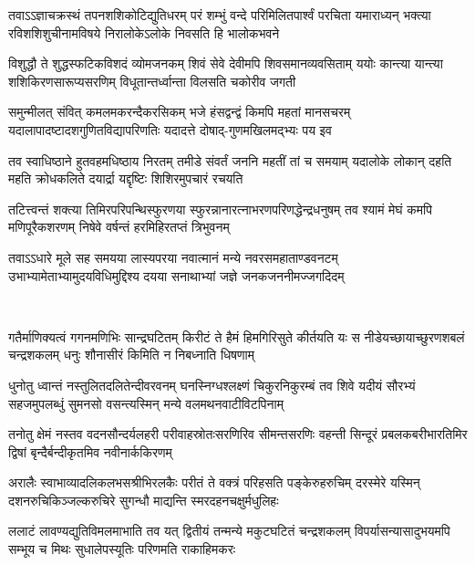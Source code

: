 \fourlineindentedshloka
{तवाऽऽज्ञाचक्रस्थं तपनशशिकोटिद्युतिधरम्}
{परं शम्भुं वन्दे परिमिलितपार्श्वं परचिता}
{यमाराध्यन् भक्त्या रविशशिशुचीनामविषये}
{निरालोकेऽलोके निवसति हि भालोकभवने}%

\fourlineindentedshloka
{विशुद्धौ ते शुद्धस्फटिकविशदं व्योमजनकम्}
{शिवं सेवे देवीमपि शिवसमानव्यवसिताम्}
{ययोः कान्त्या यान्त्या शशिकिरणसारूप्यसरणिम्}
{विधूतान्तर्ध्वान्ता विलसति चकोरीव जगती}%

\fourlineindentedshloka
{समुन्मीलत् संवित् कमलमकरन्दैकरसिकम्}
{भजे हंसद्वन्द्वं किमपि महतां मानसचरम्}
{यदालापादष्टादशगुणितविद्यापरिणतिः}
{यदादत्ते दोषाद्-गुणमखिलमद्भ्यः पय इव}%

\fourlineindentedshloka
{तव स्वाधिष्ठाने हुतवहमधिष्ठाय निरतम्}
{तमीडे संवर्तं जननि महतीं तां च समयाम्}
{यदालोके लोकान् दहति महति क्रोधकलिते}
{दयार्द्रा यद्दृष्टिः शिशिरमुपचारं रचयति}%

\fourlineindentedshloka
{तटित्त्वन्तं शक्त्या तिमिरपरिपन्थिस्फुरणया}
{स्फुरन्नानारत्नाभरणपरिणद्धेन्द्रधनुषम्}
{तव श्यामं मेघं कमपि मणिपूरैकशरणम्}
{निषेवे वर्षन्तं हरमिहिरतप्तं त्रिभुवनम्}%

\fourlineindentedshloka
{तवाऽऽधारे मूले सह समयया लास्यपरया}
{नवात्मानं मन्ये नवरसमहाताण्डवनटम्}
{उभाभ्यामेताभ्यामुदयविधिमुद्दिश्य दयया}
{सनाथाभ्यां जज्ञे जनकजननीमज्जगदिदम्}%

\mbox{}\\

\fourlineindentedshloka
{गतैर्माणिक्यत्वं गगनमणिभिः सान्द्रघटितम्}
{किरीटं ते हैमं हिमगिरिसुते कीर्तयति यः}
{स नीडेयच्छायाच्छुरणशबलं चन्द्रशकलम्}
{धनुः शौनासीरं किमिति न निबध्नाति धिषणाम्}%

\fourlineindentedshloka
{धुनोतु ध्वान्तं नस्तुलितदलितेन्दीवरवनम्}
{घनस्निग्धश्लक्ष्णं चिकुरनिकुरम्बं तव शिवे}
{यदीयं सौरभ्यं सहजमुपलब्धुं सुमनसो}
{वसन्त्यस्मिन् मन्ये वलमथनवाटीविटपिनाम्}%

\fourlineindentedshloka
{तनोतु क्षेमं नस्तव वदनसौन्दर्यलहरी}
{परीवाहस्रोतःसरणिरिव सीमन्तसरणिः}
{वहन्ती सिन्दूरं प्रबलकबरीभारतिमिर}
{द्विषां बृन्दैर्बन्दीकृतमिव नवीनार्ककिरणम्}%

\fourlineindentedshloka
{अरालैः स्वाभाव्यादलिकलभसश्रीभिरलकैः}
{परीतं ते वक्त्रं परिहसति पङ्केरुहरुचिम्}
{दरस्मेरे यस्मिन् दशनरुचिकिञ्जल्करुचिरे}
{सुगन्धौ माद्यन्ति स्मरदहनचक्षुर्मधुलिहः}%

\fourlineindentedshloka
{ललाटं लावण्यद्युतिविमलमाभाति तव यत्}
{द्वितीयं तन्मन्ये मकुटघटितं चन्द्रशकलम्}
{विपर्यासन्यासादुभयमपि सम्भूय च मिथः}
{सुधालेपस्यूतिः परिणमति राकाहिमकरः}%

